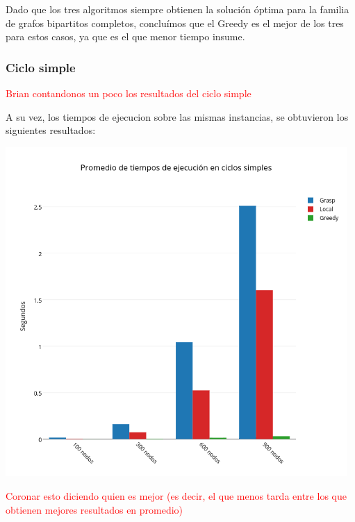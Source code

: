 Dado que los tres algoritmos siempre obtienen la solución óptima para la familia de grafos bipartitos completos, concluímos que el Greedy es el mejor de los tres para estos casos, ya que es el que menor tiempo insume. 

\subsubsection{Ciclo simple}

\textcolor{red}{Brian contandonos un poco los resultados del ciclo simple}

A su vez, los tiempos de ejecucion sobre las mismas instancias, se obtuvieron los siguientes resultados:

\begin{center}
 	\includegraphics[width=13cm, keepaspectratio=yes]{imagenes/coliseo/Cicle.png}
\end{center}

\textcolor{red}{Coronar esto diciendo quien es mejor (es decir, el que menos tarda entre los que obtienen mejores resultados en promedio)}